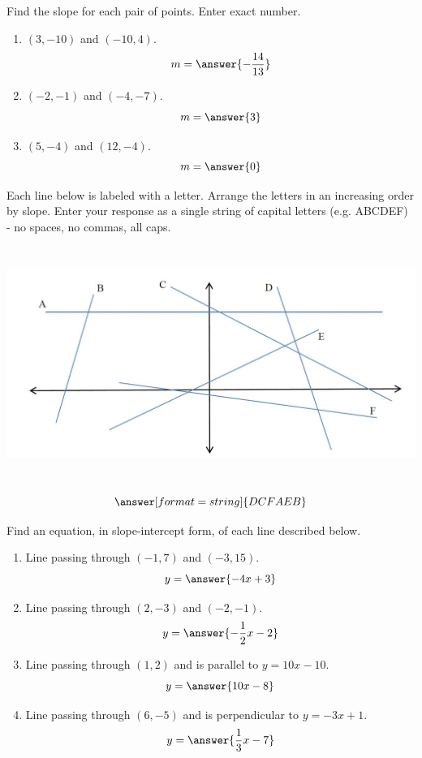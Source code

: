 \documentclass{ximera}
\begin{document}
\begin{problem}\label{prob:160hom4prob1} 
 Find the slope for each pair of points.  Enter exact number.
 \begin{enumerate}
     \item $(3, -10)$ and $(-10,4)$.
     $$m=\answer{-\frac{14}{13}}$$
     \item $(-2, -1)$ and $(-4,-7)$.
     $$m=\answer{3}$$
     \item $(5, -4)$ and $(12,-4)$.
     $$m=\answer{0}$$
 \end{enumerate}
 \end{problem}
 
 \begin{problem}\label{prob:160hom4prob2} 
 Each line below is labeled with a letter.  Arrange the letters in an increasing order by slope.  Enter your response as a single string of capital letters (e.g. ABCDEF) - no spaces, no commas, all caps.
 
 \begin{image}
   \includegraphics[height=3in]{160H4pic1.jpg}
 \end{image}
 $$\answer[format=string]{DCFAEB}$$
 \end{problem}
 
\begin{problem}\label{prob:160hom4prob3}
Find an equation, in slope-intercept form, of each line described below.
  \begin{enumerate}
      \item Line passing through $(-1, 7)$ and $(-3, 15)$.
      $$y=\answer{-4x+3}$$
      \item Line passing through $(2, -3)$ and $(-2, -1)$.
      $$y=\answer{-\frac{1}{2}x-2}$$
      \item Line passing through $(1,2)$ and is parallel to $y=10x-10$.
      $$y=\answer{10x-8}$$
      \item Line passing through $(6, -5)$ and is perpendicular to $y=-3x+1$.
      $$y=\answer{\frac{1}{3}x-7}$$
  \end{enumerate}
\end{problem}
\end{document}
